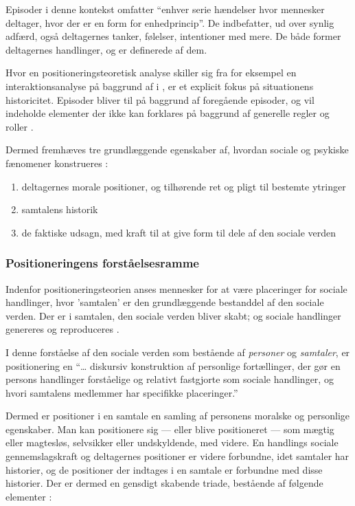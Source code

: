 Episoder i denne kontekst omfatter “enhver serie hændelser hvor 
mennesker deltager, hvor der er en form for enhedprincip”. De 
indbefatter, ud over synlig adfærd, også deltagernes tanker, 
følelser, intentioner med mere. De både former deltagernes 
handlinger, og er definerede af dem.

Hvor en positioneringsteoretisk analyse skiller sig fra for 
eksempel en interaktionsanalyse på baggrund af 
\citeauthor{goffmanPresentationSelfEveryday1956} i
, er et explicit 
fokus på situationens historicitet. Episoder bliver til på 
baggrund af foregående episoder, og vil indeholde elementer der 
ikke kan forklares på baggrund af generelle regler og roller 
\autocite[s. 5-6]{harrePositioningTheoryMoral1999}.

Dermed fremhæves tre grundlæggende egenskaber af, hvordan sociale 
og psykiske fænomener konstrueres 
\autocite{harrePositioningTheoryMoral1999}:
\begin{enumerate}
  \item
    deltagernes morale positioner, og tilhørende ret og pligt 
    til bestemte ytringer
  \item
    samtalens historik
  \item
    de faktiske udsagn, med kraft til at give form til dele af 
    den sociale verden
\end{enumerate}


\subsubsection{Positioneringens forståelsesramme}

Indenfor positioneringsteorien anses mennesker for at være 
placeringer for sociale handlinger, hvor 'samtalen' er den 
grundlæggende bestanddel af den sociale verden. Der er i samtalen,
den sociale verden bliver skabt; og sociale handlinger genereres 
og reproduceres \autocite[s. 
15]{harrePositioningTheoryMoral1999}.

I denne forståelse af den sociale verden som bestående af 
\emph{personer} og \emph{samtaler}, er positionering en “\ldots 
diskursiv konstruktion af personlige fortællinger, der gør en 
persons handlinger forståelige og relativt fastgjorte som sociale 
handlinger, og hvori samtalens medlemmer har specifikke 
placeringer.” \autocite[s. 16]{harrePositioningTheoryMoral1999}

Dermed er positioner i en samtale en samling af personens moralske
og personlige egenskaber. Man kan positionere sig — eller blive 
positioneret — som mægtig eller magtesløs, selvsikker eller 
undskyldende, med videre. En handlings sociale gennemslagskraft og
deltagernes positioner er videre forbundne, idet samtaler har 
historier, og de positioner der indtages i en samtale er forbundne
med disse historier. Der er dermed en gensdigt skabende triade, 
bestående af følgende elementer \autocite[s.  
17-18]{harrePositioningTheoryMoral1999}:

